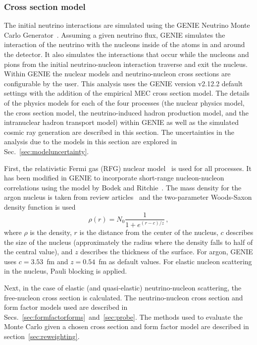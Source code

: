   \subsubsection{Cross section model}\label{sec:geniexsec}
    The initial neutrino interactions are simulated using the GENIE Neutrino
    Monte Carlo Generator~\cite{Andreopoulos:2009rq,Andreopoulos:2015wxa}.
    Assuming a given neutrino flux, GENIE simulates the interaction of the
    neutrino with the nucleons inside of the atoms in and around the detector.
    It also simulates the interactions that occur while the nucleons and pions
    from the initial neutrino-nucleon interaction traverse and exit the
    nucleus. Within GENIE the nuclear models and neutrino-nucleon cross
    sections are configurable by the user. This analysis uses the GENIE version
    v2.12.2 default settings with the addition of the empirical MEC cross
    section model. The details of the physics models for each of the four
    processes (the nuclear physics model, the cross section model, the
    neutrino-induced hadron production model, and the intranuclear hadron
    transport model) within GENIE as well as the simulated cosmic ray
    generation are described in this section. The uncertainties in the analysis
    due to the models in this section are explored in
    Sec.~\ref{sec:modeluncertainty}.

    First, the relativistic Fermi gas (RFG) nuclear model~\cite{Smith:1972xh}
    is used for all processes. It has been modified in GENIE to incorporate
    short-range nucleon-nucleon correlations using the model by Bodek and
    Ritchie~\cite{Bodek:1981wr}. The mass density for the argon nucleus is
    taken from review articles~\cite{DeJager:1987qc} and the two-parameter
    Woods-Saxon density function is used~\cite{Woods:1954zz}
    \begin{equation}\label{eq:woodssaxon}
      \rho(r) = N_0\frac{1}{1+e^{(r-c)/z}} \,,
    \end{equation}
    where $\rho$ is the density, $r$ is the distance from the center of the
    nucleus, $c$ describes the size of the nucleus (approximately the radius
    where the density falls to half of the central value), and $z$ describes
    the thickness of the surface. For argon, GENIE uses $c=3.53$~fm and
    $z=0.54$~fm as default values.  For elastic nucleon scattering in the
    nucleus, Pauli blocking is applied.
    
    Next, in the case of elastic (and quasi-elastic) neutrino-nucleon
    scattering, the free-nucleon cross section is calculated. The
    neutrino-nucleon cross section and form factor models used are described in
    Secs.~\ref{sec:formfactorforms}~and~\ref{sec:probe}. The methods used to
    evaluate the Monte Carlo given a chosen cross section and form factor
    model are described in section~\ref{sec:reweighting}.

